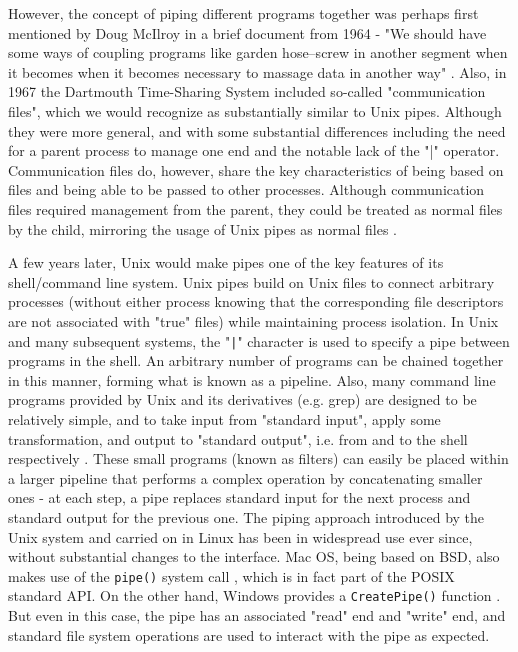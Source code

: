 However, the concept of piping different programs together was perhaps first mentioned by Doug McIlroy in a brief document from 1964 - "We should have some ways of coupling programs like garden hose--screw in another segment when it becomes when it becomes necessary to massage data in another way" \cite{mcilroy}.  Also, in 1967 the Dartmouth Time-Sharing System included so-called "communication files", which we would recognize as substantially similar to Unix pipes. Although they were more general, and with some substantial differences including the need for a parent process to manage one end and the notable lack of the "|" operator. Communication files do, however, share the key characteristics of being based on files and being able to be passed to other processes. Although communication files required management from the parent, they could be treated as normal files by the child, mirroring the usage of Unix pipes as normal files \cite{mcilroydartmouth}. 

A few years later, Unix would make pipes one of the key features of its shell/command line system. Unix pipes build on Unix files to connect arbitrary processes (without either process knowing that the corresponding file descriptors are not associated with "true" files) while maintaining process isolation. In Unix and many subsequent systems, the "\texttt{|}" character is used to specify a pipe between programs in the shell. An arbitrary number of programs can be chained together in this manner, forming what is known as a pipeline. Also, many command line programs provided by Unix and its derivatives (e.g. grep) are designed to be relatively simple, and to take input from "standard input", apply some transformation, and output to "standard output", i.e. from and to the shell respectively \cite{unix2}.  These small programs (known as filters) can easily be placed within a larger pipeline that performs a complex operation by concatenating smaller ones - at each step, a pipe replaces standard input for the next process and standard output for the previous one. The piping approach introduced by the Unix system and carried on in Linux has been in widespread use ever since, without substantial changes to the interface. Mac OS, being based on BSD, also makes use of the \texttt{pipe()} system call \cite{macos}, which is in fact part of the POSIX standard API. On the other hand, Windows provides a \texttt{CreatePipe()} function \cite{windows}.  But even in this case, the pipe has an associated "read" end and "write" end, and standard file system operations are used to interact with the pipe as expected.

